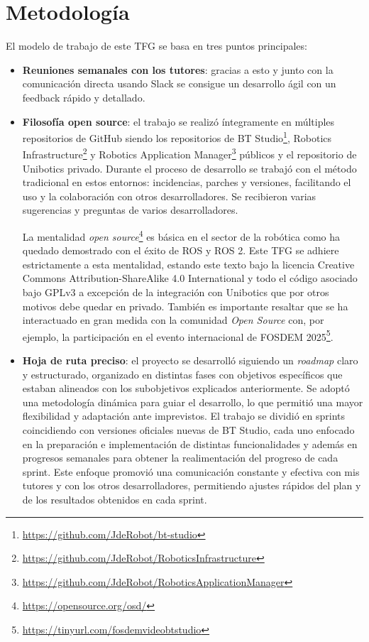 \section{Metodología}

El modelo de trabajo de este TFG se basa en tres puntos principales:

\begin{itemize}
    \item \textbf{Reuniones semanales con los tutores}: gracias a esto y junto con la comunicación directa usando Slack se consigue un desarrollo ágil con un feedback rápido y detallado. 
    
    \item \textbf{Filosofía open source}: el trabajo se realizó íntegramente en múltiples repositorios de GitHub siendo los repositorios de BT Studio\footnote{\url{https://github.com/JdeRobot/bt-studio}}, Robotics Infrastructure\footnote{\url{https://github.com/JdeRobot/RoboticsInfrastructure}} y Robotics Application Manager\footnote{\url{https://github.com/JdeRobot/RoboticsApplicationManager}} públicos y el repositorio de Unibotics privado. Durante el proceso de desarrollo se trabajó con el método tradicional en estos entornos: incidencias, parches y versiones, facilitando el uso y la colaboración con otros desarrolladores. Se recibieron varias sugerencias y preguntas de varios desarrolladores. 
    
    La mentalidad \textit{open source}\footnote{\url{https://opensource.org/osd/}} es básica en el sector de la robótica como ha quedado demostrado con el éxito de ROS y ROS 2. Este TFG se adhiere estrictamente a esta mentalidad, estando este texto bajo la licencia Creative Commons Attribution-ShareAlike 4.0 International y todo el código asociado bajo GPLv3 a excepción de la integración con Unibotics que por otros motivos debe quedar en privado. También es importante resaltar que se ha interactuado en gran medida con la comunidad \textit{Open Source} con, por ejemplo, la participación en el evento internacional de FOSDEM 2025\footnote{\url{https://tinyurl.com/fosdemvideobtstudio}}. 

    \item \textbf{Hoja de ruta preciso}: el proyecto se desarrolló siguiendo un \textit{roadmap} claro y estructurado, organizado en distintas fases con objetivos específicos que estaban alineados con los subobjetivos explicados anteriormente. Se adoptó una metodología dinámica para guiar el desarrollo, lo que permitió una mayor flexibilidad y adaptación ante imprevistos. El trabajo se dividió en sprints coincidiendo con versiones oficiales nuevas de BT Studio, cada uno enfocado en la preparación e implementación de distintas funcionalidades y además en progresos semanales para obtener la realimentación del progreso de cada sprint. Este enfoque promovió una comunicación constante y efectiva con mis tutores y con los otros desarrolladores, permitiendo ajustes rápidos del plan y de los resultados obtenidos en cada sprint.
\end{itemize}

